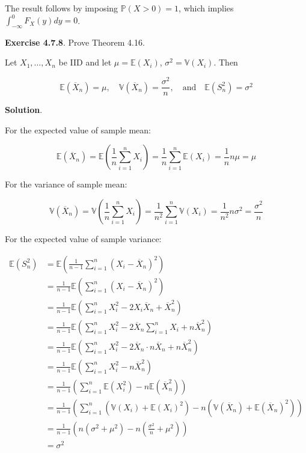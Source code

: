 The result follows by imposing \(\mathbb{P}(X > 0) = 1\), which implies
\(\int_{-\infty}^{0} F_X(y) dy = 0\).

\textbf{Exercise 4.7.8}. Prove Theorem 4.16.

Let \(X_{1}, \dots, X_{n}\) be IID and let \(\mu = \mathbb{E}(X_{i})\),
\(\sigma^{2} = \mathbb{V}(X_{i})\). Then

\[ 
\mathbb{E}\left(\overline{X}_{n}\right) = \mu,
\quad
\mathbb{V}\left(\overline{X}_{n}\right) = \frac{\sigma^{2}}{n},
\quad \text{and} \quad
\mathbb{E}\left(S_{n}^{2}\right) = \sigma^{2}
\]

\textbf{Solution}.

For the expected value of sample mean:

\[ \mathbb{E}\left(\overline{X}_{n}\right) 
= \mathbb{E}\left( \frac{1}{n} \sum_{i=1}^{n} X_{i} \right)
= \frac{1}{n} \sum_{i=1}^{n} \mathbb{E}(X_{i})
= \frac{1}{n} n\mu = \mu \]

For the variance of sample mean:

\[ \mathbb{V}\left(\overline{X}_{n}\right) 
= \mathbb{V}\left( \frac{1}{n} \sum_{i=1}^{n} X_{i} \right)
= \frac{1}{n^{2}} \sum_{i=1}^{n} \mathbb{V}(X_{i})
= \frac{1}{n^{2}} n \sigma^{2} = \frac{\sigma^{2}}{n} \]

For the expected value of sample variance:

\begin{align*}
\mathbb{E}(S_{n}^{2}) &= \mathbb{E}\left(\frac{1}{n - 1} \sum_{i=1}^{n} \left(X_{i} - \overline{X}_{n}\right)^{2} \right) \\
&= \frac{1}{n - 1} \mathbb{E} \left( \sum_{i=1}^{n} \left(X_{i} - \overline{X}_{n}\right)^{2} \right) \\
&= \frac{1}{n - 1} \mathbb{E} \left( \sum_{i=1}^{n} X_{i}^{2} - 2 X_{i} \overline{X}_{n} + \overline{X}_{n}^{2} \right) \\
&= \frac{1}{n - 1} \mathbb{E} \left( \sum_{i=1}^{n} X_{i}^{2} - 2 \overline{X}_{n} \sum_{i=1}^{n} X_{i} + n \overline{X}_{n}^{2} \right) \\
&= \frac{1}{n - 1} \mathbb{E} \left( \sum_{i=1}^{n} X_{i}^{2} - 2 \overline{X}_{n} \cdot n \overline{X}_{n}  + n \overline{X}_{n}^{2} \right) \\
&= \frac{1}{n - 1} \mathbb{E} \left( \sum_{i=1}^{n} X_{i}^{2} - n \overline{X}_{n}^{2} \right) \\
&= \frac{1}{n - 1} \left( \sum_{i=1}^{n}  \mathbb{E}(X_{i}^{2}) - n \mathbb{E}\left( \overline{X}_{n}^{2} \right) \right) \\
&= \frac{1}{n - 1} \left( \sum_{i=1}^{n} \left(\mathbb{V}(X_{i}) + \mathbb{E}(X_{i})^{2} \right) - n \left(\mathbb{V}\left( \overline{X}_{n} \right) + \mathbb{E}\left(\overline{X}_{n}\right)^{2} \right)\right) \\
&= \frac{1}{n -1} \left( n \left( \sigma^{2} + \mu^{2}\right) - n \left(\frac{\sigma^{2}}{n} + \mu^{2} \right) \right) \\
&= \sigma^{2}
\end{align*}

